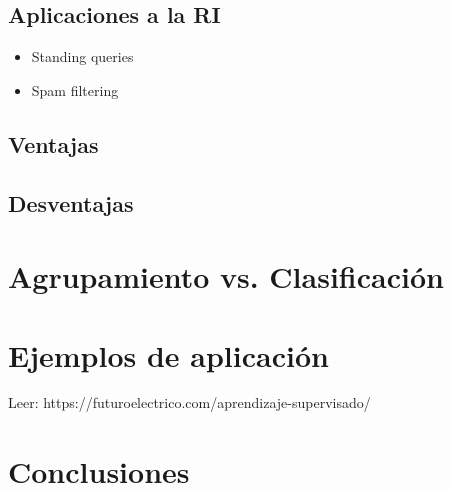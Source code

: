 \documentclass{llncs}
\begin{document}
\subsection{Aplicaciones a la RI}
\begin{itemize}
	\item Standing queries
	\item Spam filtering
\end{itemize}

\subsection{Ventajas} 

\subsection{Desventajas}

\section{Agrupamiento vs. Clasificaci\'on}

\section{Ejemplos de aplicación}

Leer: https://futuroelectrico.com/aprendizaje-supervisado/


\section{Conclusiones}
\end{document}
